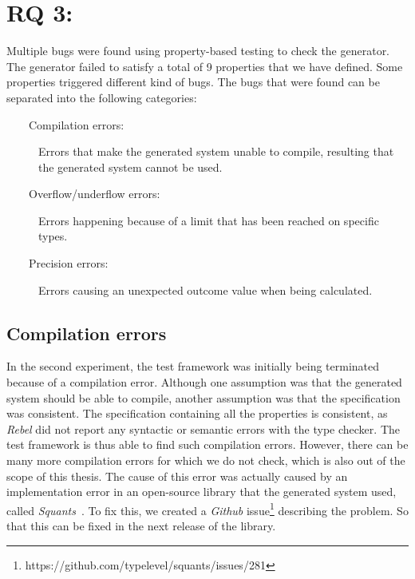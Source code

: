 \section{RQ 3: \rqThree{}}
Multiple bugs were found using property-based testing to check the generator.
The generator failed to satisfy a total of 9 properties that we have defined.
Some properties triggered different kind of bugs. The bugs that were found can
be separated into the following categories:
\begin{description}
  \item[~~~~Compilation errors:] Errors that make the generated system unable to compile, resulting that the generated system cannot be used.
  \item[~~~~Overflow/underflow errors:] Errors happening because of a limit that has been reached on specific types.
  \item[~~~~Precision errors:] Errors causing an unexpected outcome value when being calculated.
\end{description}

\subsection*{Compilation errors}
In the second experiment, the test framework was initially being terminated because of a
compilation error. Although one assumption was that the generated system should
be able to compile, another assumption was that the specification was
consistent. The specification containing all the properties is consistent,
as \textit{Rebel} did not report any syntactic or semantic errors with the type
checker. The test framework is thus able to find such compilation errors. However,
there can be many more compilation errors for which we do not check, which is
also out of the scope of this thesis. The cause of this error was actually
caused by an implementation error in an open-source library that the generated
system used, called \textit{Squants}~\cite{siteSquants2017}. To fix this, we
created a \textit{Github}
issue\footnote{https://github.com/typelevel/squants/issues/281} describing the
problem. So that this can be fixed in the next release of the library.

